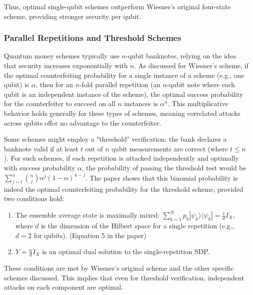 \documentclass{article} %
\begin{document}
Thus, optimal single-qubit schemes outperform Wiesner’s original four-state scheme, providing stronger security per qubit.

\subsubsection{Parallel Repetitions and Threshold Schemes}

Quantum money schemes typically use $n$-qubit banknotes, relying on the idea that security increases exponentially with $n$. As discussed for Wiesner's scheme, if the optimal counterfeiting probability for a single instance of a scheme (e.g., one qubit) is $\alpha$, then for an $n$-fold parallel repetition (an $n$-qubit note where each qubit is an independent instance of the scheme), the optimal success probability for the counterfeiter to succeed on all $n$ instances is $\alpha^n$. This multiplicative behavior holds generally for these types of schemes, meaning correlated attacks across qubits offer no advantage to the counterfeiter.

Some schemes might employ a "threshold" verification: the bank declares a banknote valid if at least $t$ out of $n$ qubit measurements are correct (where $t \le n$). For such schemes, if each repetition is attacked independently and optimally with success probability $\alpha$, the probability of passing the threshold test would be $\sum_{j=t}^{n} \binom{n}{j} \alpha^j (1 - \alpha)^{n-j}$. The paper shows that this binomial probability is indeed the optimal counterfeiting probability for the threshold scheme, provided two conditions hold:
\begin{enumerate}
    \item The ensemble average state is maximally mixed: $\sum_{k=1}^{N} p_k |\psi_k\rangle\langle\psi_k| = \frac{1}{d}I_X$, where $d$ is the dimension of the Hilbert space for a single repetition (e.g., $d=2$ for qubits). (Equation 5 in the paper)
    \item $Y = \frac{\alpha}{d}I_X$ is an optimal dual solution to the single-repetition SDP.
\end{enumerate}
These conditions are met by Wiesner's original scheme and the other specific schemes discussed. This implies that even for threshold verification, independent attacks on each component are optimal.

\end{document}
